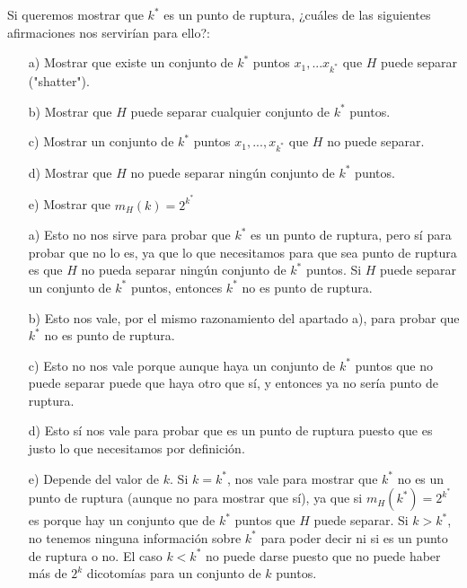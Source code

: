 \documentclass[12pt]{article}
\theoremstyle{definition}
\begin{document}
\begin{pregunta}
Si queremos mostrar que $k^*$ es un punto de ruptura, ¿cuáles de las siguientes afirmaciones nos servirían para ello?:
\begin{enumerate}
\item[a)] Mostrar que existe un conjunto de $k^*$ puntos $x_1,...x_{k^*}$ que $H$ puede separar ("shatter").
\item[b)] Mostrar que $H$ puede separar cualquier conjunto de $k^*$ puntos.
\item[c)] Mostrar un conjunto de $k^*$ puntos $x_1,...,x_{k^*}$ que $H$ no puede separar.
\item[d)] Mostrar que $H$ no puede separar ningún conjunto de $k^*$ puntos.
\item[e)] Mostrar que $m_H(k)=2^{k^*}$
\end{enumerate}

\begin{enumerate}
\item[a)] Esto no nos sirve para probar que $k^*$ es un punto de ruptura, pero sí para probar que no lo es, ya que lo que necesitamos para que sea punto de ruptura es que $H$ no pueda separar ningún conjunto de $k^*$ puntos. Si $H$ puede separar un conjunto de $k^*$ puntos, entonces $k^*$ no es punto de ruptura.
\item[b)] Esto nos vale, por el mismo razonamiento del apartado a), para probar que $k^*$ no es punto de ruptura.
\item[c)] Esto no nos vale porque aunque haya un conjunto de $k^*$ puntos que no puede separar puede que haya otro que sí, y entonces ya no sería punto de ruptura.
\item[d)] Esto sí nos vale para probar que es un punto de ruptura puesto que es justo lo que necesitamos por definición.
\item[e)] Depende del valor de $k$. Si $k=k^*$, nos vale para mostrar que $k^*$ no es un punto de ruptura (aunque no para mostrar que sí), ya que si $m_H(k^*)=2^{k^*}$ es porque hay un conjunto que de $k^*$ puntos que $H$ puede separar. Si $k>k^*$, no tenemos ninguna información sobre $k^*$ para poder decir ni si es un punto de ruptura o no. El caso $k<k^*$ no puede darse puesto que no puede haber más de $2^k$ dicotomías para un conjunto de $k$ puntos.
\end{enumerate}

\end{pregunta}
\end{document}
